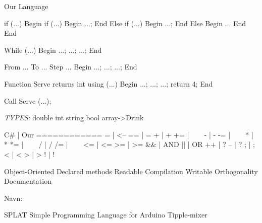 Our Language

if (...)
Begin
	if (...)
	Begin
		...;
	End
	Else if (...)
	Begin
		...;
	End
	Else
	Begin
	...
	End
End


While (...)
Begin
	...;
	...;
	...;
End
	

From ... To ... Step ...
Begin
	...;
	...;
	...;
End

Function Serve returns int using (...)
Begin
	...;
	...;
	...;
	return 4;
End

Call Serve (...);

\textit{TYPES:}
double
int
string
bool
array->Drink


C#	|	Our
============
=  	|	<--
==	|	=
+	|	+
+=	|	~~~
-	|	-
-=	|	~~~
*	|	*
*=	|	~~~
/	|	/
/=	|	~~~
<=	|	<=
>=	|	>=
&&	|	AND
||	|	OR
++	|	?
--	|	?
;	|	;
<	|	<
>	|	>
!	|	!

Object-Oriented
Declared methods
Readable
Compilation
Writable
Orthogonality
Documentation

Navn:

SPLAT
Simple Programming Language for Arduino Tipple-mixer

